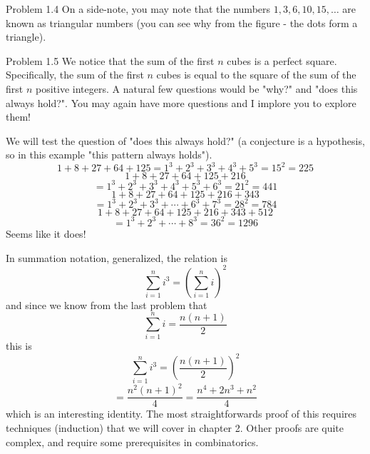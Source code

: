 \begin{sol}{Problem 1.4}
On a side-note, you may note that the numbers $1, 3, 6, 10, 15, \ldots$ are known as triangular numbers (you can see why from the figure - the dots form a triangle). 
\end{sol}

\begin{sol}{Problem 1.5}
We notice that the sum of the first $n$ cubes is a perfect square. Specifically, the sum of the first $n$ cubes is equal to the square of the sum of the first $n$ positive integers. A natural few questions would be "why?" and "does this always hold?". You may again have more questions and I implore you to explore them! 

We will test the question of "does this always hold?" (a conjecture is a hypothesis, so in this example "this pattern always holds").
\[
1 + 8 + 27 + 64 + 125 = 1^3 + 2^3 + 3^3 + 4^3 + 5^3 = 15^2 = 225
\]
\[
1 + 8 + 27 + 64 + 125 + 216 
\]
\[
= 1^3 + 2^3 + 3^3 + 4^3 + 5^3 + 6^3 = 21^2 = 441
\]
\[
1 + 8 + 27 + 64 + 125 + 216 + 343 
\]
\[
= 1^3 + 2^3 + 3^3 + \cdots + 6^3 + 7^3 = 28^2 = 784
\]
\[
1 + 8 + 27 + 64 + 125 + 216 + 343 + 512 
\]
\[
= 1^3 + 2^3 + \cdots + 8^3 = 36^2 = 1296
\]
Seems like it does!

In summation notation, generalized, the relation is
\[
\sum_{i=1}^{n}i^3 = \left( \sum_{i=1}^{n}i\right)^2
\]
and since we know from the last problem that 
\[
\sum_{i=1}^{n}i = \frac{n(n+1)}{2}
\]
this is
\[
\sum_{i=1}^{n}i^3 = \left( \frac{n(n+1)}{2} \right)^2
\]
\[
= \frac{n^2(n+1)^2}{4} =  \frac{n^4 + 2n^3 + n^2}{4}
\]
which is an interesting identity. The most straightforwards proof of this requires techniques (induction) that we will cover in chapter 2. Other proofs are quite complex, and require some prerequisites in combinatorics.
\end{sol}